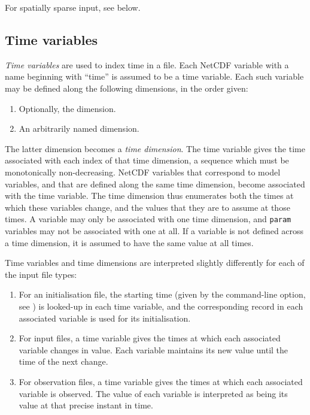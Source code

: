 For spatially sparse input, see  below.

\subsection{Time variables\label{Time_variables}}

\emph{Time variables} are used to index time in a file. Each NetCDF variable
with a name beginning with ``time'' is assumed to be a time variable. Each
such variable may be defined along the following dimensions, in the order
given:
\begin{enumerate}
\item Optionally, the  dimension.
\item An arbitrarily named dimension.
\end{enumerate}
The latter dimension becomes a \emph{time
  dimension}. The time variable gives the time
associated with each index of that time dimension, a sequence which must be
monotonically non-decreasing. NetCDF variables that correspond to model
variables, and that are defined along the same time dimension, become
associated with the time variable. The time dimension thus enumerates both the
times at which these variables change, and the values that they are to assume
at those times. A variable may only be associated with one time dimension, and
\texttt{param} variables may not be associated with one at all. If a variable
is not defined across a time dimension, it is assumed to have the same value
at all times.

Time variables and time dimensions are interpreted slightly differently for
each of the input file types:
\begin{enumerate}
\item For an initialisation file, the starting time (given by the
   command-line option, see ) is
  looked-up in each time variable, and the corresponding record in each
  associated variable is used for its initialisation.
\item For input files, a time variable gives the times at which each
  associated variable changes in value. Each variable maintains its new
  value until the time of the next change.
\item For observation files, a time variable gives the times at which each
  associated variable is observed. The value of each variable is interpreted
  as being its value at that precise instant in time.
\end{enumerate}

